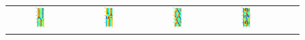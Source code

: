 \begin{figure}[h!t]
\begin{center}
\begin{tabular}{cccccc}
\includegraphics[width=0.15\textwidth]{../figs/ks22rpo059.9-05.44.eps}\hspace{-3ex} &
\includegraphics[width=0.15\textwidth]{../figs/ks22rpo084.4-05.51.eps}\hspace{-3ex} &
\includegraphics[width=0.15\textwidth]{../figs/ks22rpo064.7-00.00.eps}\hspace{-3ex} &
\includegraphics[width=0.15\textwidth]{../figs/ks22rpo070.3-00.00.eps}
\end{tabular}
\end{center}
\caption[Relative periodic and pre-periodic orbits, $L = 22$]{
}
\end{figure}
